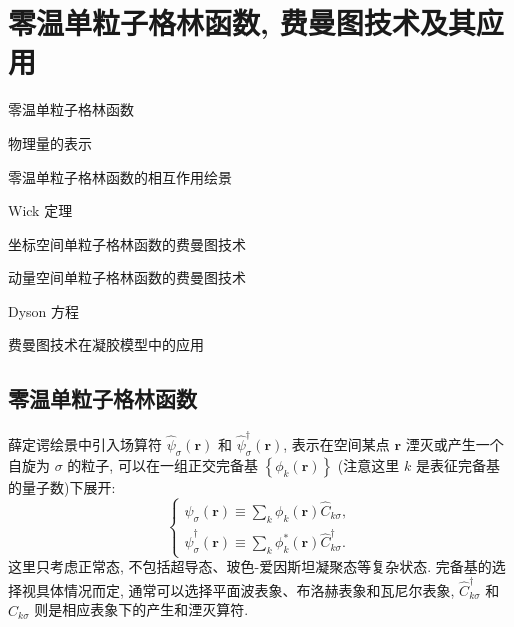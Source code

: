 \setcounter{chapter}{2}
\chapter{零温单粒子格林函数, 费曼图技术及其应用}
\begin{introduction}
\item 零温单粒子格林函数
\item 物理量的表示
\item 零温单粒子格林函数的相互作用绘景
\item Wick 定理
\item 坐标空间单粒子格林函数的费曼图技术
\item 动量空间单粒子格林函数的费曼图技术
\item Dyson 方程
\item 费曼图技术在凝胶模型中的应用
\end{introduction}
\section{零温单粒子格林函数}
薛定谔绘景中引入场算符 $\hat{\psi}_{\sigma}(\boldsymbol{r})$ 和 $\hat{\psi}_{\sigma}^{\dagger}(\boldsymbol{r})$, 表示在空间某点 $\boldsymbol{r}$ 湮灭或产生一个自旋为 $\sigma$ 的粒子, 可以在一组正交完备基 $\left\{\phi_{k}(\boldsymbol{r})\right\}$ (注意这里 $k$ 是表征完备基的量子数)下展开:
\begin{equation}
\left\{\begin{aligned}
\hat{\psi}_{\sigma}(\boldsymbol{r}) \equiv \sum_{k} \phi_{k}(\boldsymbol{r}) \hat{C}_{k \sigma}, \\
\hat{\psi}_{\sigma}^{\dagger}(\boldsymbol{r}) \equiv \sum_{k} \phi_{k}^*(\boldsymbol{r}) \hat{C}_{k \sigma}^{\dagger}.
\end{aligned}\right.
\end{equation}
这里只考虑正常态, 不包括超导态、玻色-爱因斯坦凝聚态等复杂状态. 完备基的选择视具体情况而定, 通常可以选择平面波表象、布洛赫表象和瓦尼尔表象, $\hat{C}_{k \sigma}^{\dagger}$ 和 $\hat{C}^{}_{k \sigma}$ 则是相应表象下的产生和湮灭算符. 


